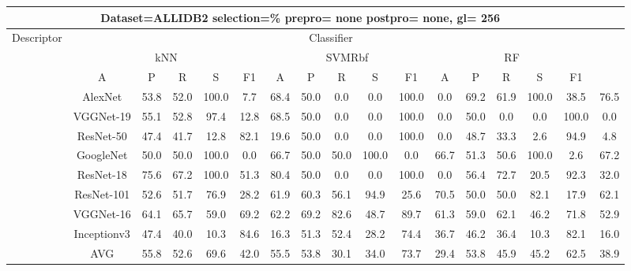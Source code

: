 \documentclass[12pt,italian]{article}
\begin{document}
\begin{tiny}
\begin{longtable}{lcccccccccccccccc}
\toprule
\multicolumn{16}{c}{Dataset=ALLIDB2 selection=\% prepro= none postpro= none, gl= 256} \\ 
\toprule
Descriptor & \multicolumn{15}{c}{Classifier} \\ 
& \multicolumn{5}{c}{kNN} & \multicolumn{5}{c}{SVMRbf} & \multicolumn{5}{c}{RF} \\ 
& A & P & R & S & F1 & A & P & R & S & F1 & A & P & R & S & F1 \\ 
\midrule
& AlexNet & 53.8 & 52.0 & 100.0 &  7.7 & 68.4 & 50.0 &  0.0 &  0.0 & 100.0 &  0.0 & 69.2 & 61.9 & 100.0 & 38.5 & 76.5 \\ 
& VGGNet-19 & 55.1 & 52.8 & 97.4 & 12.8 & 68.5 & 50.0 &  0.0 &  0.0 & 100.0 &  0.0 & 50.0 &  0.0 &  0.0 & 100.0 &  0.0 \\ 
& ResNet-50 & 47.4 & 41.7 & 12.8 & 82.1 & 19.6 & 50.0 &  0.0 &  0.0 & 100.0 &  0.0 & 48.7 & 33.3 &  2.6 & 94.9 &  4.8 \\ 
& GoogleNet & 50.0 & 50.0 & 100.0 &  0.0 & 66.7 & 50.0 & 50.0 & 100.0 &  0.0 & 66.7 & 51.3 & 50.6 & 100.0 &  2.6 & 67.2 \\ 
& ResNet-18 & 75.6 & 67.2 & 100.0 & 51.3 & 80.4 & 50.0 &  0.0 &  0.0 & 100.0 &  0.0 & 56.4 & 72.7 & 20.5 & 92.3 & 32.0 \\ 
& ResNet-101 & 52.6 & 51.7 & 76.9 & 28.2 & 61.9 & 60.3 & 56.1 & 94.9 & 25.6 & 70.5 & 50.0 & 50.0 & 82.1 & 17.9 & 62.1 \\ 
& VGGNet-16 & 64.1 & 65.7 & 59.0 & 69.2 & 62.2 & 69.2 & 82.6 & 48.7 & 89.7 & 61.3 & 59.0 & 62.1 & 46.2 & 71.8 & 52.9 \\ 
& Inceptionv3 & 47.4 & 40.0 & 10.3 & 84.6 & 16.3 & 51.3 & 52.4 & 28.2 & 74.4 & 36.7 & 46.2 & 36.4 & 10.3 & 82.1 & 16.0 \\ 
\hline
& AVG & 55.8 & 52.6 & 69.6 & 42.0 & 55.5 & 53.8 & 30.1 & 34.0 & 73.7 & 29.4 & 53.8 & 45.9 & 45.2 & 62.5 & 38.9 \\ 
\hline
\bottomrule
\end{longtable} 

 \pagebreak 
\end{tiny} 
 
\end{document}
